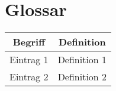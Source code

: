 
\chapter*{Glossar}
\begin{table}[H]
	\begin{center}
		\begin{tabular}{ c | c}
			\parbox[c][0.8cm][c]{.3\linewidth}{\centering\textbf{Begriff} } 
			& 
			\parbox[c][0.8cm][c]{.6\linewidth}{\centering\textbf{Definition}}
			\\
			\hline %
			\hline %
			\parbox[c][0.8cm][c]{.3\linewidth}{\centering Eintrag 1 }  
			& 
			\parbox[c][0.8cm][c]{.6\linewidth}{\centering Definition 1}
			\\ 
			\hline %
			\parbox[c][0.8cm][c]{.3\linewidth}{\centering Eintrag 2 }  
			& 
			\parbox[c][0.8cm][c]{.6\linewidth}{\centering Definition 2}
			\\ 
		\end{tabular}
	\end{center}
\end{table}
